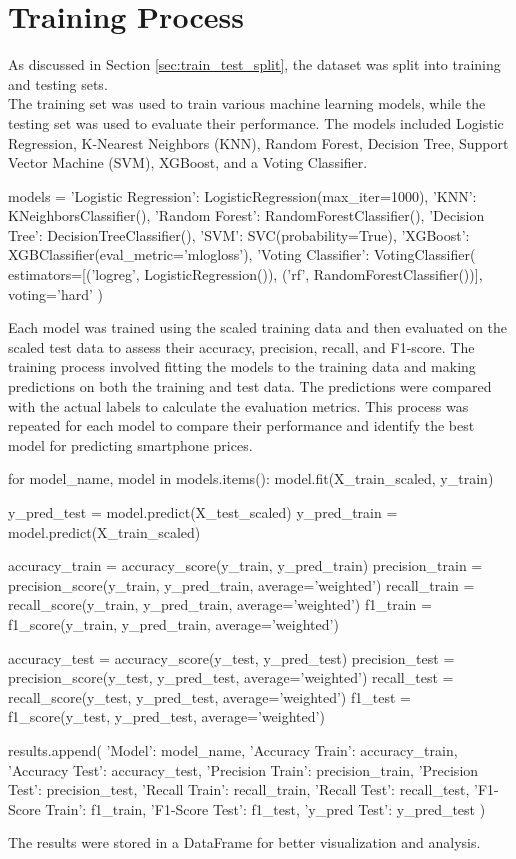 \documentclass[12pt]{report}
\begin{document}
\section{Training Process}
As discussed in Section \ref{sec:train_test_split}, the dataset was split into training and testing sets. \\
The training set was used to train various machine learning models, while the testing set was used to evaluate their performance. The models included Logistic Regression, K-Nearest Neighbors (KNN), Random Forest, Decision Tree, Support Vector Machine (SVM), XGBoost, and a Voting Classifier. \\
\begin{python}
models = {
	'Logistic Regression': LogisticRegression(max_iter=1000),
	'KNN': KNeighborsClassifier(),
	'Random Forest': RandomForestClassifier(),
	'Decision Tree': DecisionTreeClassifier(),
	'SVM': SVC(probability=True),
	'XGBoost': XGBClassifier(eval_metric='mlogloss'),
	'Voting Classifier': VotingClassifier(
			estimators=[('logreg', LogisticRegression()), 
			('rf', RandomForestClassifier())], voting='hard'
	)
} 
\end{python}
Each model was trained using the scaled training data and then evaluated on the scaled test data to assess their accuracy, precision, recall, and F1-score. The training process involved fitting the models to the training data and making predictions on both the training and test data. The predictions were compared with the actual labels to calculate the evaluation metrics. This process was repeated for each model to compare their performance and identify the best model for predicting smartphone prices. \\
\begin{python}
for model_name, model in models.items():
	model.fit(X_train_scaled, y_train)
	
	y_pred_test = model.predict(X_test_scaled)
	y_pred_train = model.predict(X_train_scaled)
	
	accuracy_train = accuracy_score(y_train, y_pred_train)
	precision_train = precision_score(y_train, y_pred_train, average='weighted')
	recall_train = recall_score(y_train, y_pred_train, average='weighted')
	f1_train = f1_score(y_train, y_pred_train, average='weighted')

	accuracy_test = accuracy_score(y_test, y_pred_test)
	precision_test = precision_score(y_test, y_pred_test, average='weighted')
	recall_test = recall_score(y_test, y_pred_test, average='weighted')
	f1_test = f1_score(y_test, y_pred_test, average='weighted')

	results.append({
			'Model': model_name,
			'Accuracy Train': accuracy_train,
			'Accuracy Test': accuracy_test,
			'Precision Train': precision_train,
			'Precision Test': precision_test,
			'Recall Train': recall_train,
			'Recall Test': recall_test,
			'F1-Score Train': f1_train,
			'F1-Score Test': f1_test,
			'y_pred Test': y_pred_test 
	})
\end{python}
The results were stored in a DataFrame for better visualization and analysis.
\end{document}
